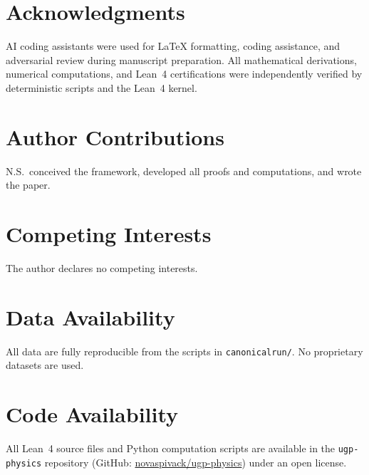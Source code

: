 \documentclass[11pt]{article}
\theoremstyle{remark}
\newcommand{\lean}[1]{%
  \penalty-100
  \begingroup\def\_{\textunderscore\allowbreak}\texttt{#1}\endgroup}
\begin{document}
\section*{Acknowledgments}

AI coding assistants were used for LaTeX formatting, coding assistance, and adversarial review during manuscript preparation. All mathematical derivations, numerical computations, and Lean~4 certifications were independently verified by deterministic scripts and the Lean~4 kernel.

\section*{Author Contributions}
N.S.\ conceived the framework, developed all proofs and computations, and wrote the paper.

\section*{Competing Interests}
The author declares no competing interests.

\section*{Data Availability}
All data are fully reproducible from the scripts in \lean{canonical\_run/}.
No proprietary datasets are used.

\section*{Code Availability}
All Lean~4 source files and Python computation scripts are available in the
\lean{ugp-physics} repository (GitHub: \href{https://github.com/novaspivack/ugp-physics}{novaspivack/ugp-physics})
under an open license.
\end{document}
